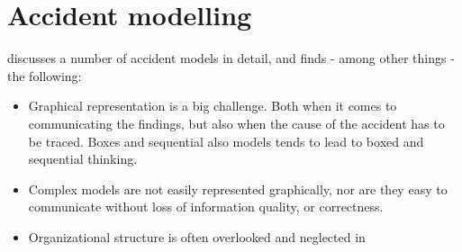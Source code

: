


\chapter{Accident modelling}

\cite{hollnagel2004barriers} discusses a number of accident models in detail, and finds - among other things - the following:

\begin{itemize}
\item Graphical representation is a big challenge. Both when it comes to communicating the findings, but also when the cause of the accident has to be traced. Boxes and sequential also models tends to lead to boxed and sequential thinking.
\item Complex models are not easily represented graphically, nor are they easy to communicate without loss of information quality, or correctness.
\item Organizational structure is often overlooked and neglected in 
\end{itemize}

